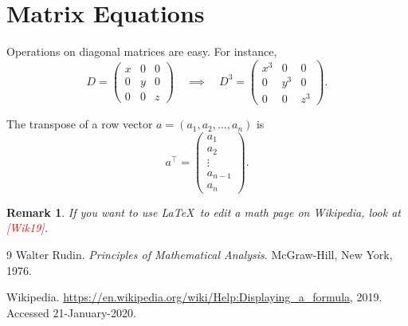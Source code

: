 \documentclass[12pt]{article}
\newtheorem{remark}{Remark}[section]
\begin{document}
	\section{Matrix Equations}
	
	Operations on diagonal matrices are easy. For instance,
	\begin{equation*}
	D = \begin{pmatrix}
		x & 0 & 0 \\
		0 & y & 0 \\
		0 & 0 & z
	\end{pmatrix}
	\quad \implies \quad
	D^3 = \begin{pmatrix}
		x^3 & 0 & 0 \\
		0 & y^3 & 0 \\
		0 & 0 & z^3
	\end{pmatrix}.
	\end{equation*}
	
	The transpose of a row vector $a = (a_1, a_2, \ldots, a_n)$ is
	\begin{equation*}
	a^\top = \begin{pmatrix}
		a_1 \\ a_2 \\ \vdots \\ a_{n-1} \\ a_n
	\end{pmatrix}.
	\end{equation*}
	\begin{remark}
		If you want to use \LaTeX\ to edit a math page on Wikipedia, look at \textcolor{red}{[Wik19]}.
	\end{remark}
	\begin{thebibliography}{9}
		Walter Rudin. \emph{Principles of Mathematical Analysis}. 
		McGraw-Hill, New York, 1976.
		
		Wikipedia. \textcolor{blue}{\url{https://en.wikipedia.org/wiki/Help:Displaying_a_formula},} 2019. Accessed 21-January-2020.
	\end{thebibliography}
	
\end{document}
